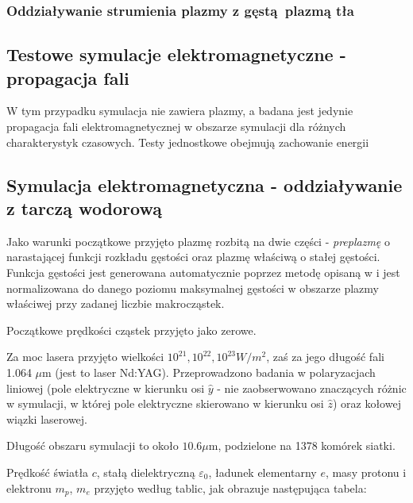 \subsubsection{Oddziaływanie strumienia plazmy z gęstą plazmą tła}

\subsection{Testowe symulacje elektromagnetyczne - propagacja fali}
W tym przypadku symulacja nie zawiera plazmy, a badana jest jedynie propagacja fali elektromagnetycznej w obszarze
symulacji dla różnych charakterystyk czasowych. %
Testy jednostkowe obejmują zachowanie energii %

\subsection{Symulacja elektromagnetyczna - oddziaływanie z tarczą wodorową}

Jako warunki początkowe przyjęto plazmę rozbitą na dwie części - \emph{preplazmę} o narastającej funkcji rozkładu
gęstości oraz plazmę właściwą o stałej gęstości. Funkcja gęstości jest generowana automatycznie poprzez metodę opisaną
w %
i jest normalizowana do danego poziomu maksymalnej gęstości w obszarze plazmy właściwej przy zadanej liczbie makrocząstek.

Początkowe prędkości cząstek przyjęto jako zerowe.

Za moc lasera przyjęto wielkości $10^{21}, 10^{22}, 10^{23} W/m^2$,
zaś za jego długość fali 1.064 $\mu$m (jest to laser Nd:YAG). Przeprowadzono badania w polaryzacjach liniowej (pole elektryczne w kierunku osi $\hat{y}$ - nie zaobserwowano
znaczących różnic w symulacji, w której pole elektryczne skierowano w kierunku osi $\hat{z}$) %
oraz
kołowej wiązki laserowej.

Długość obszaru symulacji to około $10.6 \mu$m, podzielone na 1378 komórek siatki.

Prędkość światła $c$, stałą dielektryczną $\varepsilon_0$, ładunek
elementarny $e$, masy protonu i elektronu $m_p$, $m_e$ przyjęto według
tablic, jak obrazuje następująca tabela: %

